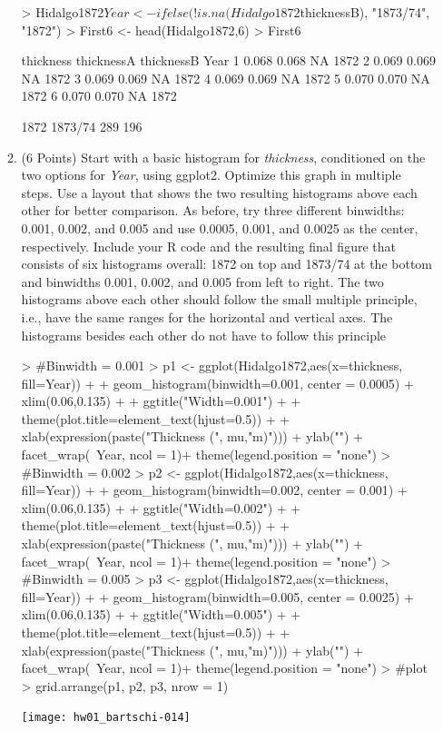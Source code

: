 \documentclass[12pt,letterpaper,final]{article}
\begin{document}
\begin{enumerate}
\begin{enumerate}
\begin{Schunk}
\begin{Sinput}
> Hidalgo1872$Year <- ifelse(!is.na(Hidalgo1872$thicknessB), "1873/74", "1872")
> First6 <- head(Hidalgo1872,6)
> First6
\end{Sinput}
\begin{Soutput}
  thickness thicknessA thicknessB Year
1     0.068      0.068         NA 1872
2     0.069      0.069         NA 1872
3     0.069      0.069         NA 1872
4     0.069      0.069         NA 1872
5     0.070      0.070         NA 1872
6     0.070      0.070         NA 1872
\end{Soutput}
\begin{Soutput}
   1872 1873/74 
    289     196 
\end{Soutput}
\end{Schunk}


\item (6 Points)
Start with a basic histogram for {\it thickness}, conditioned on the
two options for {\it Year}, using ggplot2. Optimize this graph
in multiple steps. Use a layout that shows the two resulting
histograms above each other for better comparison.
As before,
try three different binwidths: 0.001, 0.002, and 0.005 and use 0.0005, 0.001, and 0.0025
as the center, respectively.
Include your R code and the resulting final figure
that consists of six histograms overall: 1872 on top and 1873/74 at the bottom and binwidths
0.001, 0.002, and 0.005 from left to right. The two histograms above each other
should follow the small multiple principle, i.e., have the same ranges for the
horizontal and vertical axes. The histograms besides each other do not
have to follow this principle

\begin{Schunk}
\begin{Sinput}
> #Binwidth = 0.001
> p1 <- ggplot(Hidalgo1872,aes(x=thickness, fill=Year)) + 
+   geom_histogram(binwidth=0.001, center = 0.0005) + xlim(0.06,0.135) +
+   ggtitle("Width=0.001") +
+   theme(plot.title=element_text(hjust=0.5)) +
+   xlab(expression(paste("Thickness (", mu,"m)"))) + ylab("") + facet_wrap(~Year, ncol = 1)+ theme(legend.position = "none")
> #Binwidth = 0.002
> p2 <- ggplot(Hidalgo1872,aes(x=thickness, fill=Year)) + 
+   geom_histogram(binwidth=0.002, center = 0.001) + xlim(0.06,0.135) +
+   ggtitle("Width=0.002") +
+   theme(plot.title=element_text(hjust=0.5)) +
+   xlab(expression(paste("Thickness (", mu,"m)"))) + ylab("") + facet_wrap(~Year, ncol = 1)+ theme(legend.position = "none")
> #Binwidth = 0.005
> p3 <- ggplot(Hidalgo1872,aes(x=thickness, fill=Year)) + 
+   geom_histogram(binwidth=0.005, center = 0.0025) + xlim(0.06,0.135) +
+   ggtitle("Width=0.005") +
+   theme(plot.title=element_text(hjust=0.5)) +
+   xlab(expression(paste("Thickness (", mu,"m)"))) + ylab("") + facet_wrap(~Year, ncol = 1)+ theme(legend.position = "none")
> #plot
> grid.arrange(p1, p2, p3, nrow = 1)
\end{Sinput}
\end{Schunk}
\texttt{[image: hw01\_bartschi-014]}



\end{enumerate}
\end{enumerate}
\end{document}
